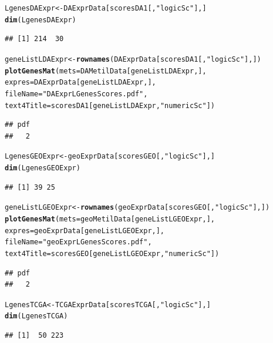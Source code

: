 \documentclass[a4paper,10pt]{article}\usepackage[]{graphicx}\usepackage[]{xcolor}
\makeatletter
\newcommand{\hlstr}[1]{\textcolor[rgb]{0.192,0.494,0.8}{#1}}%
\newcommand{\hlstd}[1]{\textcolor[rgb]{0.345,0.345,0.345}{#1}}%
\newcommand{\hlkwb}[1]{\textcolor[rgb]{0.69,0.353,0.396}{#1}}%
\newcommand{\hlkwc}[1]{\textcolor[rgb]{0.333,0.667,0.333}{#1}}%
\newcommand{\hlkwd}[1]{\textcolor[rgb]{0.737,0.353,0.396}{\textbf{#1}}}%
\newenvironment{kframe}{%
 \def\at@end@of@kframe{}%
 \ifinner\ifhmode%
  \def\at@end@of@kframe{\end{minipage}}%
  \begin{minipage}{\columnwidth}%
 \fi\fi%
 \def\FrameCommand##1{\hskip\@totalleftmargin \hskip-\fboxsep
 \colorbox{shadecolor}{##1}\hskip-\fboxsep
     \hskip-\linewidth \hskip-\@totalleftmargin \hskip\columnwidth}%
 \MakeFramed {\advance\hsize-\width
   \@totalleftmargin\z@ \linewidth\hsize
   \@setminipage}}%
 {\par\unskip\endMakeFramed%
 \at@end@of@kframe}
\newenvironment{knitrout}{}{} %
\makeatother
\begin{document}
\begin{knitrout}
\color{fgcolor}\begin{kframe}
\begin{alltt}
\hlstd{LgenesDAExpr} \hlkwb{<-} \hlstd{DAExprData[scoresDA1[,}\hlstr{"logicSc"}\hlstd{],]}
\hlkwd{dim}\hlstd{(LgenesDAExpr)}
\end{alltt}
\begin{verbatim}
## [1] 214  30
\end{verbatim}
\begin{alltt}
\hlstd{geneListLDAExpr} \hlkwb{<-} \hlkwd{rownames}\hlstd{(DAExprData[scoresDA1[,}\hlstr{"logicSc"}\hlstd{],])}
\hlkwd{plotGenesMat} \hlstd{(}\hlkwc{mets}\hlstd{=DAMetilData[geneListLDAExpr,],}
              \hlkwc{expres}\hlstd{=DAExprData[geneListLDAExpr,],}
              \hlkwc{fileName} \hlstd{=}\hlstr{"DAExprLGenesScores.pdf"}\hlstd{,}
              \hlkwc{text4Title} \hlstd{= scoresDA1[geneListLDAExpr,}\hlstr{"numericSc"}\hlstd{])}
\end{alltt}
\begin{verbatim}
## pdf 
##   2
\end{verbatim}
\begin{alltt}
\hlstd{LgenesGEOExpr} \hlkwb{<-} \hlstd{geoExprData[scoresGEO[,}\hlstr{"logicSc"}\hlstd{],]}
\hlkwd{dim}\hlstd{(LgenesGEOExpr)}
\end{alltt}
\begin{verbatim}
## [1] 39 25
\end{verbatim}
\begin{alltt}
\hlstd{geneListLGEOExpr} \hlkwb{<-} \hlkwd{rownames}\hlstd{(geoExprData[scoresGEO[,}\hlstr{"logicSc"}\hlstd{],])}
\hlkwd{plotGenesMat} \hlstd{(}\hlkwc{mets}\hlstd{=geoMetilData[geneListLGEOExpr,],}
              \hlkwc{expres}\hlstd{=geoExprData[geneListLGEOExpr,],}
              \hlkwc{fileName} \hlstd{=}\hlstr{"geoExprLGenesScores.pdf"}\hlstd{,}
              \hlkwc{text4Title} \hlstd{= scoresGEO[geneListLGEOExpr,}\hlstr{"numericSc"}\hlstd{])}
\end{alltt}
\begin{verbatim}
## pdf 
##   2
\end{verbatim}
\begin{alltt}
\hlstd{LgenesTCGA} \hlkwb{<-} \hlstd{TCGAExprData[scoresTCGA[,}\hlstr{"logicSc"}\hlstd{],]}
\hlkwd{dim}\hlstd{(LgenesTCGA)}
\end{alltt}
\begin{verbatim}
## [1]  50 223
\end{verbatim}

\end{kframe}
\end{knitrout}
\end{document}
